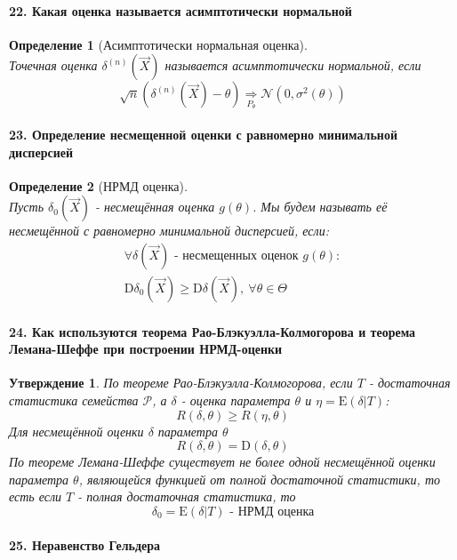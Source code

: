 \documentclass[titlepage]{article}
\newcommand{\sP}{\mathcal{P}}
\newcommand{\sE}{\mathrm{E}}
\newcommand{\sD}{\mathrm{D}}
\newtheorem{definition}{Определение}
\newtheorem*{statement}{Утверждение}
\begin{document}
\paragraph{22. Какая оценка называется асимптотически нормальной}
\begin{definition}[Асимптотически нормальная оценка] ~\\
	Точечная оценка $\delta^{(n)}(\vec{X})$ называется асимптотически нормальной, если
	$$\sqrt{n} (\delta^{(n)}(\vec{X}) - \theta) \underset{P_\theta}{\Rightarrow} \mathcal{N}(0,\sigma^2(\theta))$$
\end{definition}

\paragraph{23. Определение несмещенной оценки с равномерно минимальной дисперсией}
\begin{definition}[НРМД оценка] ~\\
	Пусть $\delta_0(\vec X)$ - несмещённая оценка $g(\theta)$. Мы будем называть её несмещённой с равномерно минимальной дисперсией, если:
	\begin{gather*}		
		\forall \delta(\vec X) \text{ - несмещенных оценок } g(\theta):\\
		\sD\delta_0(\vec X) \geq \sD\delta(\vec X),\ \forall \theta \in \Theta
	\end{gather*}
\end{definition}

\paragraph{24. Как используются теорема Рао-Блэкуэлла-Колмогорова и теорема Лемана-Шеффе при построении НРМД-оценки}
\begin{statement}
	По теореме Рао-Блэкуэлла-Колмогорова, если $T$ - достаточная статистика семейства $\sP$, а $\delta$ - оценка параметра $\theta$ и $\eta=\sE(\delta|T)$:
	\[R(\delta,\theta)\geq R(\eta,\theta)\]
	Для несмещённой оценки $\delta$ параметра $\theta$
	\[R(\delta,\theta) = \sD(\delta, \theta)\]
	По теореме Лемана-Шеффе существует не более одной несмещённой оценки параметра $\theta$, являющейся функцией от полной достаточной статистики, то есть если $T$ - полная достаточная статистика, то
	\[\delta_0 = \sE(\delta|T) \text{ - НРМД оценка}\]
\end{statement}

\paragraph{25. Неравенство Гельдера}
\end{document}
